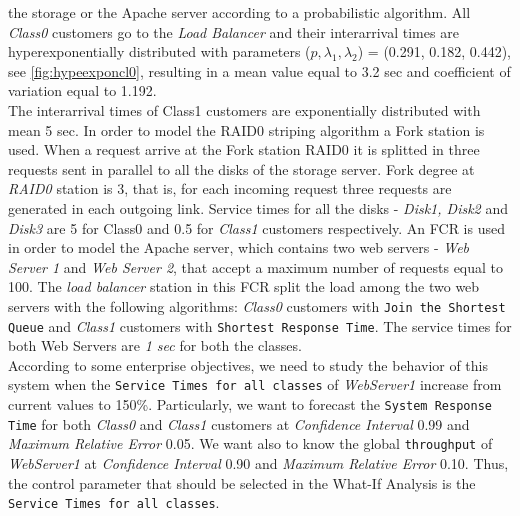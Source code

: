 the storage or the Apache server according to a probabilistic
algorithm. All \emph{Class0} customers go to the \emph{Load
Balancer} and their interarrival times are hyperexponentially
distributed with parameters ($p, \lambda_1, \lambda_2$) = (0.291,
0.182, 0.442), see \autoref{fig:hypeexponcl0}, resulting in a
mean value equal
to 3.2 sec and coefficient of variation equal to 1.192.\\
The interarrival times of Class1 customers are exponentially
distributed with mean 5 sec. In order to model the RAID0 striping
algorithm a Fork station is used. When a request arrive at the
Fork station RAID0 it is splitted in three requests sent in
parallel to all the disks of the storage server. Fork degree at
\emph{RAID0} station is 3, that is, for each incoming request
three requests are generated in each outgoing link. Service times
for all the disks - \emph{Disk1, Disk2} and \emph{Disk3} are 5 for
Class0 and 0.5 for \emph{Class1} customers respectively. An FCR is
used in order to model the Apache server, which contains two web
servers - \emph{Web Server 1} and \emph{Web Server 2}, that accept
a maximum number of requests equal to 100. The \emph{load
balancer} station in this FCR split the load among the two web
servers with the following algorithms: \emph{Class0} customers
with \texttt{Join the Shortest Queue} and \emph{Class1} customers
with \texttt{Shortest Response Time}. The service times for both
Web Servers are \emph{1 sec} for both the
classes.\\
According to some enterprise  objectives, we need to study the
behavior of this system when the \texttt{Service Times for all
classes} of \emph{WebServer1} increase from current values to
150\%. Particularly, we want to forecast the \texttt{System
Response Time} for both \emph{Class0} and \emph{Class1} customers
at \emph{Confidence Interval} 0.99 and \emph{Maximum Relative
Error} 0.05. We want also to know the global \texttt{throughput}
of \emph{WebServer1} at \emph{Confidence Interval} 0.90 and
\emph{Maximum Relative Error} 0.10. Thus, the control parameter
that should be selected in the What-If Analysis is the
\texttt{Service Times for all classes}.\\

